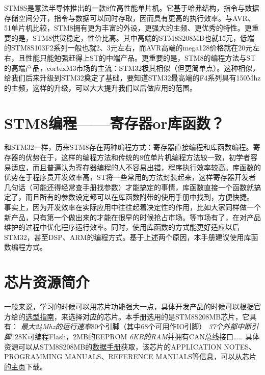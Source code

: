 \documentclass[a4paper]{book}
\begin{document}
STM8S是意法半导体推出的一款8位高性能单片机。它基于哈弗结构，指令与数据存储空间分开，指令与数据可以同时存取，因而具有更高的执行效率。与AVR、51单片机比较，STM8拥有更为丰富的外设，更强大的主频、更优秀的特性。更重要的是，STM8供货稳定，性价比高。其中高端的STM8S208MB也就15元，低端的STM8S103F2系列一般也就2、3元左右，而AVR高端的mega128价格就在20元左右，且性能只能勉强赶得上ST的中端产品。更重要的是，STM8的编程方法与ST的高端产品，cortexM3市场的主流：STM32极其相似（但更简单点）。这种相似，给我们后来升级到STM32奠定了基础，要知道STM32最高端的F4系列具有150Mhz的主频，这样的升级，可以大大提升我们以后做应用的范围。

\section{STM8编程------寄存器or库函数？}

和STM32一样，历来STM8存在两种编程方式：寄存器直接编程和库函数编程。寄存器的优势在于，这样的编程方法和传统的8位单片机编程方法较一致，初学者容易适应，而且普遍认为寄存器编程的人不容易出错，程序执行效率较高。库函数的优势在于程序员开发效率高，ST将一些常用的方法封装起来，这样寄存器开发者几句话（可能还得经常查手册找参数）才能搞定的事情，库函数直接一个函数就搞定了，而且所有的参数设定都可以在库函数附带的使用手册中找到，方便快捷。 事实上，因为开发效率在实际应用中往往起着决定性的作用，比如大家同样做一个新产品，只有第一个做出来的才能在很早的时候抢占市场。等市场有了，在对产品维护的过程中优化程序运行效率。同时，使用库函数的方式能更好适应以后STM32，甚至DSP、ARM的编程方式。基于上述两个原因，本手册建议使用库函数编程方式。

\section{芯片资源简介}

一般来说，学习的时候可以用芯片功能强大一点，具体开发产品的时候可以根据官方给的\href{http://www.st.com/internet/com/SALES\_AND\_MARKETING\_RESOURCES/MARKETING\_COMMUNICATION/MARKETING\_BROCHURE/brstm8.pdf}{选型指南}，来选择对应的芯片。本手册选用的是STM8S208MB芯片，它具有： \emph{最大24Mhz的运行速率}80个引脚（其中68个可用作IO引脚） \emph{37个外部中断引脚}128K可编程Flash，2MB的EEPROM \emph{6KB的RAM}并拥有CAN总线接口\ldots{}\ldots{} 具体资源可以从STM8S208MB的\href{http://www.st.com/internet/com/TECHNICAL\_RESOURCES/TECHNICAL\_LITERATURE/DATASHEET/CD00197787.pdf}{数据手册}获取，该芯片的APPLICATION NOTES、PROGRAMMING MANUALS、REFERENCE MANUALS等信息，可以从\href{http://www.st.com/internet/mcu/product/190232.jsp}{芯片的主页}下载。
\end{document}

